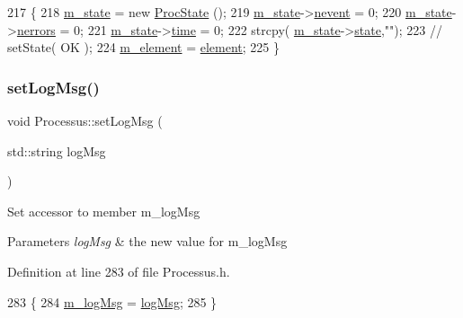 \begin{DoxyCode}
217                                      \{
218     \hyperlink{classProcessus_ab3539eee42891ceae0baf4395ae7fb61}{m\_state} = \textcolor{keyword}{new} \hyperlink{structProcState}{ProcState} ();
219     \hyperlink{classProcessus_ab3539eee42891ceae0baf4395ae7fb61}{m\_state}->\hyperlink{structProcState_a1881d6b0db849a8af15f586ad5959260}{nevent}  = 0;
220     \hyperlink{classProcessus_ab3539eee42891ceae0baf4395ae7fb61}{m\_state}->\hyperlink{structProcState_a51a0f54ba62b07e07ac8518c5f32828d}{nerrors} = 0;
221     \hyperlink{classProcessus_ab3539eee42891ceae0baf4395ae7fb61}{m\_state}->\hyperlink{structProcState_a88c69b099d8f2b2164d478f28e87610f}{time}    = 0;
222     strcpy( \hyperlink{classProcessus_ab3539eee42891ceae0baf4395ae7fb61}{m\_state}->\hyperlink{structProcState_aaffb70e5af437e2c0d4dfc69bd0b24cd}{state},\textcolor{stringliteral}{""});
223     \textcolor{comment}{//  setState( OK );}
224     \hyperlink{classProcessus_aa9d24d53c3e52f36786cabb5d8e296e7}{m\_element} = \hyperlink{classProcessus_a6fe155527431a7190b7d44d600b9608d}{element};
225   \}
\end{DoxyCode}
\mbox{\label{classProcessus_a471833f89047aa9a7ff6200a31c17a1d}} 
\subsubsection{\texorpdfstring{set\+Log\+Msg()}{setLogMsg()}}
{\footnotesize\ttfamily void Processus\+::set\+Log\+Msg (\begin{DoxyParamCaption}\item[{std\+::string}]{log\+Msg }\end{DoxyParamCaption})\hspace{0.3cm}{\ttfamily [inline]}}

Set accessor to member m\+\_\+log\+Msg 
\begin{DoxyParams}{Parameters}
{\em log\+Msg} & the new value for m\+\_\+log\+Msg \\
\hline
\end{DoxyParams}


Definition at line 283 of file Processus.\+h.


\begin{DoxyCode}
283                                     \{
284     \hyperlink{classProcessus_a3bc0140a3a69a83951ab7f9986bd2c84}{m\_logMsg} = \hyperlink{classProcessus_a42fdeb17dc13ba854222666b6aa29b61}{logMsg};
285   \}
\end{DoxyCode}
\mbox{\label{classProcessus_a831b027b9cf18ab56fa6147b5d3055da}} 
